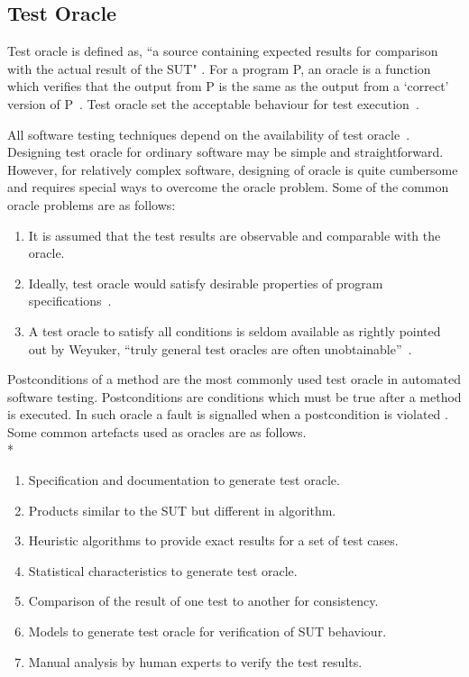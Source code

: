 \subsection{Test Oracle}
Test oracle is defined as, ``a source containing expected results for comparison with the actual result of the SUT" \cite{ahmed2010software}. For a program P, an oracle is a function which verifies that the output from P is the same as the output from a ‘correct’ version of P~\cite{howden1986functional}. Test oracle set the acceptable behaviour for test execution~\cite{baresi2001test}. 

All software testing techniques depend on the availability of test oracle~\cite{gaudel2010software}. Designing test oracle for ordinary software may be simple and straightforward. However, for relatively complex software, designing of oracle is quite cumbersome and requires special ways to overcome the oracle problem. Some of the common oracle problems are as follows:

\begin{enumerate}
\item It is assumed that the test results are observable and comparable with the oracle.
\item Ideally, test oracle would satisfy desirable properties of program specifications~\cite{baresi2001test}.
\item A test oracle to satisfy all conditions is seldom available as rightly pointed out by Weyuker, ``truly general test oracles are often unobtainable''~\cite{weyuker1982testing}. 
\end{enumerate}
\bigskip
Postconditions of a method are the most commonly used test oracle in automated software testing. Postconditions are conditions which must be true after a method is executed. In such oracle a fault is signalled when a postcondition is violated \cite{meyer2009programs}. Some common artefacts used as oracles are as follows.\\*
\begin{enumerate}
\item Specification and documentation to generate test oracle. 
\item Products similar to the SUT but different in algorithm. %
\item Heuristic algorithms to provide exact results for a set of test cases. %
\item Statistical characteristics to generate test oracle. %
\item Comparison of the result of one test to another for consistency. %
\item Models to generate test oracle for verification of SUT behaviour. %
\item Manual analysis by human experts to verify the test results. %
\end{enumerate}

